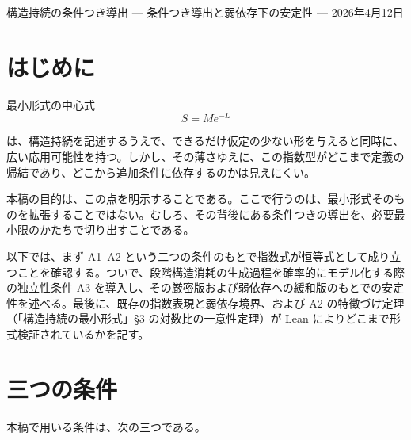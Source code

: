 \documentclass[12pt,a4paper]{article}
\begin{document}
\PaperTitleBlock
  {構造持続の条件つき導出}
  {— 条件つき導出と弱依存下の安定性 —}
  {2026年4月12日}

\begin{abstract}
構造持続の最小形式では、構造持続量を \(S = Me^{-L}\) と表す。その背後には、状態集合の残存量に関する指数式 \(m(V^{(n)}) = m(V^{(0)}) e^{-L}\) がある。この式は、状態集合の縮小率を対数比で定義する限り恒等式として成り立ち、構造消耗どうしの独立性を要しない。本稿の目的は、この恒等式を繰り返すことではなく、どこまでが定義の帰結であり、どこからが追加条件に依存するのかを明示することにある。

そのために、まず A1--A2 のもとで恒等式が成り立つことを確認する。ついで、段階構造消耗の生成過程を確率的にモデル化する際の独立性条件 A3 を導入し、その緩和のもとでどこまで安定性が保たれるかを述べる。最後に、Lean による形式検証の範囲を記す。本稿の役割は、最小形式の背後にある数学的骨格を、必要最小限のかたちで与えることにある。
\end{abstract}

\section{はじめに}\label{ux306fux3058ux3081ux306b}

最小形式の中心式 \[
S = Me^{-L}
\]

は、構造持続を記述するうえで、できるだけ仮定の少ない形を与えると同時に、広い応用可能性を持つ。しかし、その薄さゆえに、この指数型がどこまで定義の帰結であり、どこから追加条件に依存するのかは見えにくい。

本稿の目的は、この点を明示することである。ここで行うのは、最小形式そのものを拡張することではない。むしろ、その背後にある条件つきの導出を、必要最小限のかたちで切り出すことである。

以下では、まず A1--A2 という二つの条件のもとで指数式が恒等式として成り立つことを確認する。ついで、段階構造消耗の生成過程を確率的にモデル化する際の独立性条件 A3 を導入し、その厳密版および弱依存への緩和版のもとでの安定性を述べる。最後に、既存の指数表現と弱依存境界、および A2 の特徴づけ定理（「構造持続の最小形式」§3 の対数比の一意性定理）が Lean によりどこまで形式検証されているかを記す。

\section{三つの条件}\label{ux4e09ux3064ux306eux6761ux4ef6}

本稿で用いる条件は、次の三つである。
\end{document}

